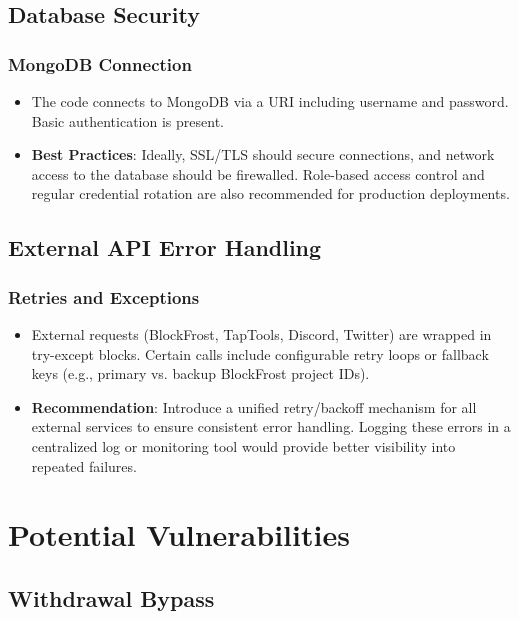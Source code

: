 \documentclass[11pt,a4paper]{report}
\begin{document}
\section{Database Security}

\subsection{MongoDB Connection}
\begin{itemize}
    \item The code connects to MongoDB via a URI including username and password. Basic authentication is present.
    \item \textbf{Best Practices}: Ideally, SSL/TLS should secure connections, and network access to the database should be firewalled. Role-based access control and regular credential rotation are also recommended for production deployments.
\end{itemize}

\section{External API Error Handling}

\subsection{Retries and Exceptions}
\begin{itemize}
    \item External requests (BlockFrost, TapTools, Discord, Twitter) are wrapped in try-except blocks. Certain calls include configurable retry loops or fallback keys (e.g., primary vs. backup BlockFrost project IDs).
    \item \textbf{Recommendation}: Introduce a unified retry/backoff mechanism for all external services to ensure consistent error handling. Logging these errors in a centralized log or monitoring tool would provide better visibility into repeated failures.
\end{itemize}

\chapter{Potential Vulnerabilities}

\section{Withdrawal Bypass}
\end{document}
